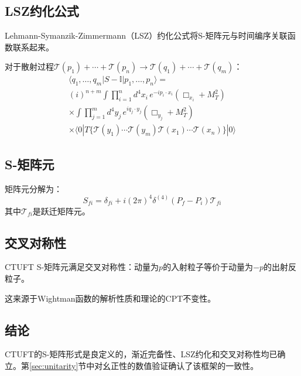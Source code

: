\subsection{LSZ约化公式}

Lehmann-Symanzik-Zimmermann（LSZ）约化公式将S-矩阵元与时间编序关联函数联系起来。

\begin{theorem}[挠率场的LSZ约化]
对于散射过程$\mathcal{T}(p_1) + \cdots + \mathcal{T}(p_n) \to \mathcal{T}(q_1) + \cdots + \mathcal{T}(q_m)$：
\begin{multline}
    \langle q_1, \ldots, q_m | S - \mathbb{I} | p_1, \ldots, p_n \rangle = \\
    (i)^{n+m} \int \prod_{i=1}^n d^4x_i \, e^{-ip_i \cdot x_i} (\Box_{x_i} + M_T^2) \\
    \times \int \prod_{j=1}^m d^4y_j \, e^{iq_j \cdot y_j} (\Box_{y_j} + M_T^2) \\
    \times \langle 0 | T\{\mathcal{T}(y_1) \cdots \mathcal{T}(y_m) \mathcal{T}(x_1) \cdots \mathcal{T}(x_n)\} | 0 \rangle
\end{multline}
\end{theorem}

\subsection{S-矩阵元}

矩阵元分解为：
\begin{equation}
    S_{fi} = \delta_{fi} + i (2\pi)^4 \delta^{(4)}(P_f - P_i) \mathcal{T}_{fi}
\end{equation}
其中$\mathcal{T}_{fi}$是跃迁矩阵元。

\subsection{交叉对称性}

\begin{theorem}[交叉对称性]
CTUFT S-矩阵元满足交叉对称性：动量为$p$的入射粒子等价于动量为$-p$的出射反粒子。
\end{theorem}

这来源于Wightman函数的解析性质和理论的CPT不变性。

\subsection{结论}

CTUFT的S-矩阵形式是良定义的，渐近完备性、LSZ约化和交叉对称性均已确立。第\ref{sec:unitarity}节中对幺正性的数值验证确认了该框架的一致性。
